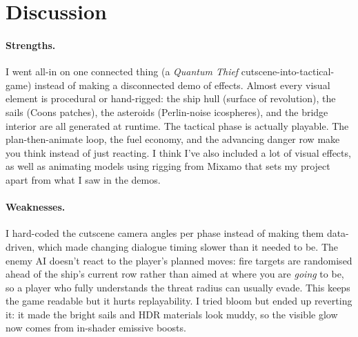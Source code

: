 \documentclass[11pt,a4paper]{article}
\begin{document}
\section{Discussion}

\paragraph{Strengths.}
I went all-in on one connected thing (a \emph{Quantum Thief}
cutscene-into-tactical-game) instead of making a disconnected demo of
effects. Almost every visual element is procedural or hand-rigged: the
ship hull (surface of revolution), the sails (Coons patches), the
asteroids (Perlin-noise icospheres), and the bridge interior are all
generated at runtime. The tactical phase is actually playable. The
plan-then-animate loop, the fuel economy, and the advancing danger row
make you think instead of just reacting. I think I've also included a lot of
visual effects, as well as animating models using rigging from Mixamo that
sets my project apart from what I saw in the demos.

\paragraph{Weaknesses.}
I hard-coded the cutscene camera angles per phase instead of making them
data-driven, which made changing dialogue timing slower than it needed to
be. The enemy AI doesn't react to the player's planned moves: fire
targets are randomised ahead of the ship's current row rather than
aimed at where you are \emph{going} to be, so a player who fully
understands the threat radius can usually evade. This keeps the game
readable but it hurts replayability. I tried bloom but ended up
reverting it: it made the bright sails and HDR materials look muddy,
so the visible glow now comes from in-shader emissive boosts.
\end{document}
